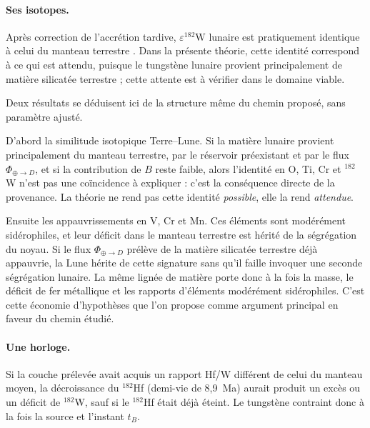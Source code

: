 \documentclass[11pt,a4paper,openany]{report}
\begin{document}
\paragraph{Ses isotopes.}
Après correction de l'accrétion tardive, $\varepsilon^{182}$W lunaire est pratiquement identique à
celui du manteau terrestre \cite{Kruijer2015,Touboul2015}. Dans la présente théorie, cette identité
correspond à ce qui est attendu, puisque le tungstène lunaire provient principalement de matière
silicatée terrestre ; cette attente est à vérifier dans le domaine viable.

\begin{apport}
Deux résultats se déduisent ici de la structure même du chemin proposé, sans paramètre ajusté.

D'abord la similitude isotopique Terre--Lune. Si la matière lunaire provient principalement du
manteau terrestre, par le réservoir préexistant et par le flux $\Phi_{\oplus\to D}$, et si la
contribution de $B$ reste faible, alors l'identité en O, Ti, Cr et $^{182}$W n'est pas une
coïncidence à expliquer : c'est la conséquence directe de la provenance. La théorie ne rend pas
cette identité \emph{possible}, elle la rend \emph{attendue}.

Ensuite les appauvrissements en V, Cr et Mn. Ces éléments sont modérément sidérophiles, et leur
déficit dans le manteau terrestre est hérité de la ségrégation du noyau. Si le flux
$\Phi_{\oplus\to D}$ prélève de la matière silicatée terrestre déjà appauvrie, la Lune hérite de
cette signature sans qu'il faille invoquer une seconde ségrégation lunaire. La même lignée de
matière porte donc à la fois la masse, le déficit de fer métallique et les rapports d'éléments
modérément sidérophiles. C'est cette économie d'hypothèses que l'on propose comme argument
principal en faveur du chemin étudié.
\end{apport}

\paragraph{Une horloge.}
Si la couche prélevée avait acquis un rapport Hf/W différent de celui du manteau moyen, la
décroissance du $^{182}$Hf (demi-vie de 8,9~Ma) aurait produit un excès ou un déficit de $^{182}$W,
sauf si le $^{182}$Hf était déjà éteint. Le tungstène contraint donc à la fois la source et l'instant
$t_B$.
\end{document}
